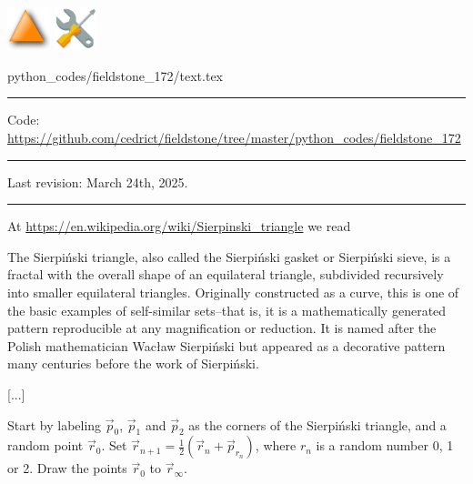 \noindent
\includegraphics[height=1.25cm]{images/pictograms/triangle}
\includegraphics[height=1.25cm]{images/pictograms/tools}


\begin{flushright} {\tiny {\color{gray} python\_codes/fieldstone\_172/text.tex}} \end{flushright}

%

\par\noindent\rule{\textwidth}{0.4pt}

\begin{center}
\inpython
{\small Code: \url{https://github.com/cedrict/fieldstone/tree/master/python_codes/fieldstone_172}}
\end{center}

\par\noindent\rule{\textwidth}{0.4pt}

Last revision: March 24th, 2025.

\par\noindent\rule{\textwidth}{0.4pt}



At \url{https://en.wikipedia.org/wiki/Sierpinski_triangle} we 
read
\begin{displayquote}
{\color{darkgray}
The Sierpiński triangle, also called the Sierpiński gasket or Sierpiński sieve, is a fractal 
with the overall shape of an equilateral triangle, subdivided recursively into smaller 
equilateral triangles. Originally constructed as a curve, this is one of the basic 
examples of self-similar sets--that is, it is a mathematically generated pattern 
reproducible at any magnification or reduction. It is named after the Polish 
mathematician Wacław Sierpiński but appeared as a decorative pattern many centuries before 
the work of Sierpiński. 

[...]

Start by labeling $\vec{p}_0$, $\vec{p}_1$ and $\vec{p}_2$ 
as the corners of the Sierpiński triangle, 
and a random point $\vec{r}_0$. 
Set $\vec{r}_{n+1} = \frac12 (\vec{r}_n+\vec{p}_{r_n})$, 
where $r_n$ is a random number 0, 1 or 2. 
Draw the points $\vec{r}_0$ to $\vec{r}_\infty$. 
}
\end{displayquote}

